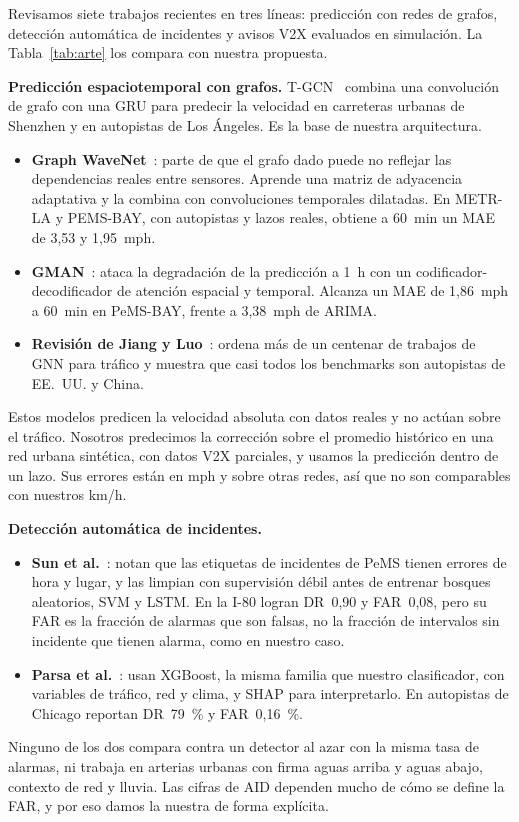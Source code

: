 Revisamos siete trabajos recientes en tres líneas: predicción con redes de grafos, detección automática de incidentes y avisos V2X evaluados en simulación. La Tabla~\ref{tab:arte} los compara con nuestra propuesta.

\textbf{Predicción espaciotemporal con grafos.} T-GCN~\cite{zhao2020tgcn} combina una convolución de grafo con una GRU para predecir la velocidad en carreteras urbanas de Shenzhen y en autopistas de Los Ángeles. Es la base de nuestra arquitectura.
\begin{itemize}
\item \textbf{Graph WaveNet}~\cite{wu2019graphwavenet}: parte de que el grafo dado puede no reflejar las dependencias reales entre sensores. Aprende una matriz de adyacencia adaptativa y la combina con convoluciones temporales dilatadas. En METR-LA y PEMS-BAY, con autopistas y lazos reales, obtiene a 60~min un MAE de 3,53 y 1,95~mph.
\item \textbf{GMAN}~\cite{zheng2020gman}: ataca la degradación de la predicción a 1~h con un codificador-decodificador de atención espacial y temporal. Alcanza un MAE de 1,86~mph a 60~min en PeMS-BAY, frente a 3,38~mph de ARIMA.
\item \textbf{Revisión de Jiang y Luo}~\cite{jiang2022gnnsurvey}: ordena más de un centenar de trabajos de GNN para tráfico y muestra que casi todos los benchmarks son autopistas de EE.~UU. y China.
\end{itemize}
Estos modelos predicen la velocidad absoluta con datos reales y no actúan sobre el tráfico. Nosotros predecimos la corrección sobre el promedio histórico en una red urbana sintética, con datos V2X parciales, y usamos la predicción dentro de un lazo. Sus errores están en mph y sobre otras redes, así que no son comparables con nuestros km/h.

\textbf{Detección automática de incidentes.}
\begin{itemize}
\item \textbf{Sun et al.}~\cite{sun2022weakaid}: notan que las etiquetas de incidentes de PeMS tienen errores de hora y lugar, y las limpian con supervisión débil antes de entrenar bosques aleatorios, SVM y LSTM. En la I-80 logran DR~0,90 y FAR~0,08, pero su FAR es la fracción de alarmas que son falsas, no la fracción de intervalos sin incidente que tienen alarma, como en nuestro caso.
\item \textbf{Parsa et al.}~\cite{parsa2020xgboost}: usan XGBoost, la misma familia que nuestro clasificador, con variables de tráfico, red y clima, y SHAP para interpretarlo. En autopistas de Chicago reportan DR~79~\% y FAR~0,16~\%.
\end{itemize}
Ninguno de los dos compara contra un detector al azar con la misma tasa de alarmas, ni trabaja en arterias urbanas con firma aguas arriba y aguas abajo, contexto de red y lluvia. Las cifras de AID dependen mucho de cómo se define la FAR, y por eso damos la nuestra de forma explícita.

